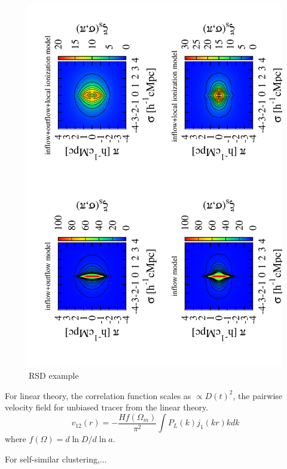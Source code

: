 \documentclass[useAMS,usenatbib,twocolumn]{mn2e}
\begin{document}
\begin{figure}
 \begin{center}
  \includegraphics[angle=-90,width=\textwidth]{figure/RSDs.pdf}
  \caption{RSD example}
 \end{center}
\end{figure}



For linear theory, the correlation function scales as $\propto D(t)^2$,
the pairwise velocity field for unbiased tracer from the linear theory.
\begin{equation}
v_{12}(r)=-\frac{Hf(\Omega_m)}{\pi^2}\int P_L(k)j_1(kr) kdk
\end{equation}
where $f(\Omega)=d\ln D/d\ln a$.


For self-similar clustering,...
\end{document}

